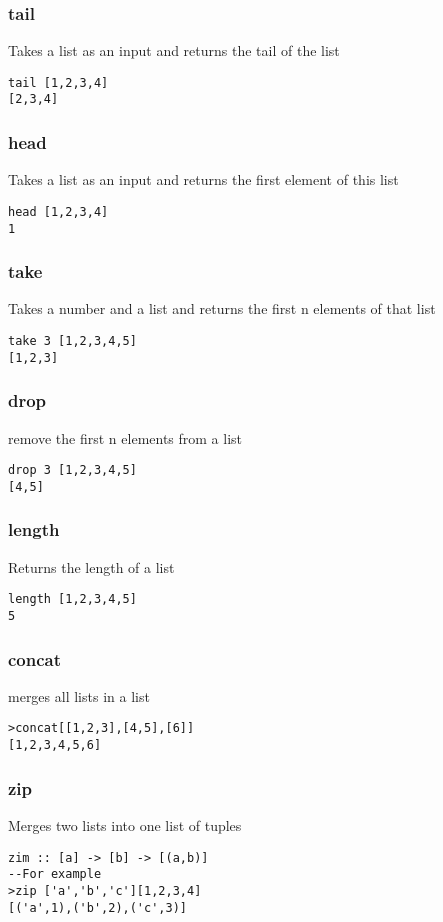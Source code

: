 \documentclass[12pt, oneside]{article}
\begin{document}
\subsubsection{tail}
Takes a list as an input and returns the tail of the list
\begin{lstlisting}
tail [1,2,3,4]
[2,3,4]
\end{lstlisting}
\subsubsection{head}
Takes a list as an input and returns the first element of this list
\begin{lstlisting}
head [1,2,3,4]
1
\end{lstlisting}
\subsubsection{take}
Takes a number and a list and returns the first n elements of that list
\begin{lstlisting}
take 3 [1,2,3,4,5]
[1,2,3]
\end{lstlisting}
\subsubsection{drop}
remove the first n elements from a list
\begin{lstlisting}
drop 3 [1,2,3,4,5]
[4,5]
\end{lstlisting}
\subsubsection{length}
Returns the length of a list
\begin{lstlisting}
length [1,2,3,4,5]
5
\end{lstlisting}
\subsubsection{concat}
merges all lists in a list

\begin{lstlisting}
>concat[[1,2,3],[4,5],[6]]
[1,2,3,4,5,6]
\end{lstlisting}
\subsubsection{zip}
Merges two lists into one list of tuples
\begin{lstlisting}
zim :: [a] -> [b] -> [(a,b)]
--For example
>zip ['a','b','c'][1,2,3,4]
[('a',1),('b',2),('c',3)]
\end{lstlisting}
\end{document}
